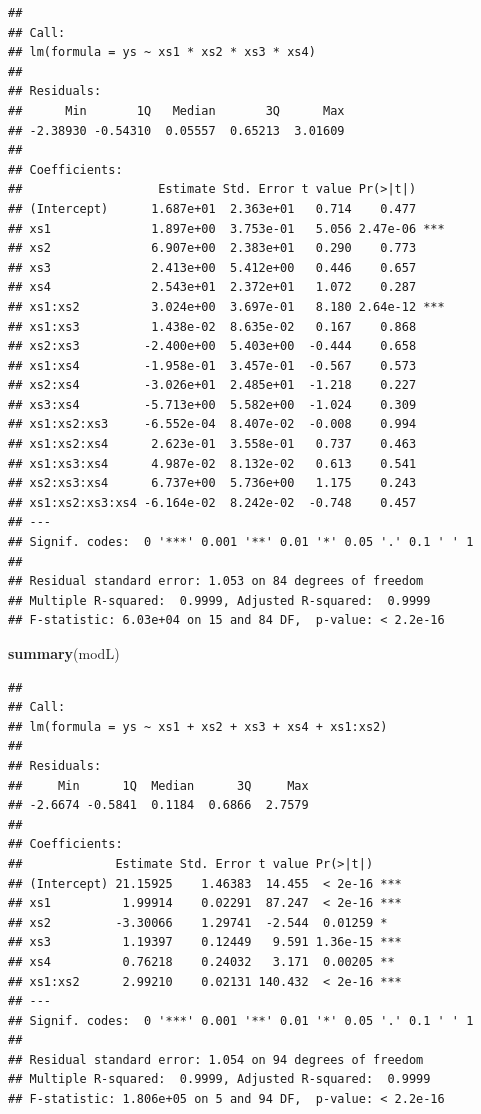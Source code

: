\documentclass[
]{book}
\newenvironment{Shaded}{\begin{snugshade}}{\end{snugshade}}
\newcommand{\KeywordTok}[1]{\textcolor[rgb]{0.13,0.29,0.53}{\textbf{#1}}}
\newcommand{\NormalTok}[1]{#1}
\begin{document}
\begin{verbatim}
## 
## Call:
## lm(formula = ys ~ xs1 * xs2 * xs3 * xs4)
## 
## Residuals:
##      Min       1Q   Median       3Q      Max 
## -2.38930 -0.54310  0.05557  0.65213  3.01609 
## 
## Coefficients:
##                   Estimate Std. Error t value Pr(>|t|)    
## (Intercept)      1.687e+01  2.363e+01   0.714    0.477    
## xs1              1.897e+00  3.753e-01   5.056 2.47e-06 ***
## xs2              6.907e+00  2.383e+01   0.290    0.773    
## xs3              2.413e+00  5.412e+00   0.446    0.657    
## xs4              2.543e+01  2.372e+01   1.072    0.287    
## xs1:xs2          3.024e+00  3.697e-01   8.180 2.64e-12 ***
## xs1:xs3          1.438e-02  8.635e-02   0.167    0.868    
## xs2:xs3         -2.400e+00  5.403e+00  -0.444    0.658    
## xs1:xs4         -1.958e-01  3.457e-01  -0.567    0.573    
## xs2:xs4         -3.026e+01  2.485e+01  -1.218    0.227    
## xs3:xs4         -5.713e+00  5.582e+00  -1.024    0.309    
## xs1:xs2:xs3     -6.552e-04  8.407e-02  -0.008    0.994    
## xs1:xs2:xs4      2.623e-01  3.558e-01   0.737    0.463    
## xs1:xs3:xs4      4.987e-02  8.132e-02   0.613    0.541    
## xs2:xs3:xs4      6.737e+00  5.736e+00   1.175    0.243    
## xs1:xs2:xs3:xs4 -6.164e-02  8.242e-02  -0.748    0.457    
## ---
## Signif. codes:  0 '***' 0.001 '**' 0.01 '*' 0.05 '.' 0.1 ' ' 1
## 
## Residual standard error: 1.053 on 84 degrees of freedom
## Multiple R-squared:  0.9999,	Adjusted R-squared:  0.9999 
## F-statistic: 6.03e+04 on 15 and 84 DF,  p-value: < 2.2e-16
\end{verbatim}

\begin{Shaded}
\begin{Highlighting}[]
\KeywordTok{summary}\NormalTok{(modL)}
\end{Highlighting}
\end{Shaded}

\begin{verbatim}
## 
## Call:
## lm(formula = ys ~ xs1 + xs2 + xs3 + xs4 + xs1:xs2)
## 
## Residuals:
##     Min      1Q  Median      3Q     Max 
## -2.6674 -0.5841  0.1184  0.6866  2.7579 
## 
## Coefficients:
##             Estimate Std. Error t value Pr(>|t|)    
## (Intercept) 21.15925    1.46383  14.455  < 2e-16 ***
## xs1          1.99914    0.02291  87.247  < 2e-16 ***
## xs2         -3.30066    1.29741  -2.544  0.01259 *  
## xs3          1.19397    0.12449   9.591 1.36e-15 ***
## xs4          0.76218    0.24032   3.171  0.00205 ** 
## xs1:xs2      2.99210    0.02131 140.432  < 2e-16 ***
## ---
## Signif. codes:  0 '***' 0.001 '**' 0.01 '*' 0.05 '.' 0.1 ' ' 1
## 
## Residual standard error: 1.054 on 94 degrees of freedom
## Multiple R-squared:  0.9999,	Adjusted R-squared:  0.9999 
## F-statistic: 1.806e+05 on 5 and 94 DF,  p-value: < 2.2e-16
\end{verbatim}
\end{document}
